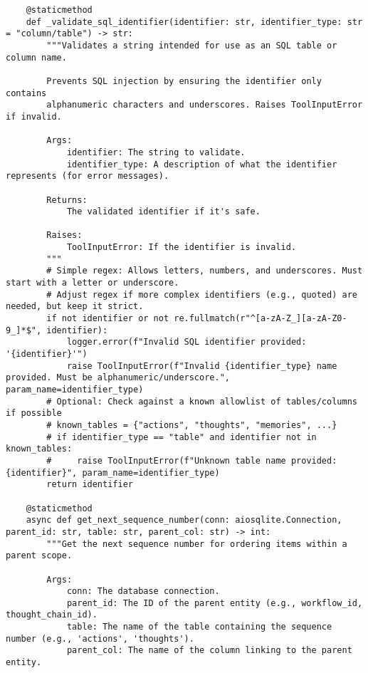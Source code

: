 \documentclass[12pt,a4paper]{article}
\begin{document}
\begin{pageablecode}
\begin{verbatim}
    @staticmethod
    def _validate_sql_identifier(identifier: str, identifier_type: str = "column/table") -> str:
        """Validates a string intended for use as an SQL table or column name.

        Prevents SQL injection by ensuring the identifier only contains
        alphanumeric characters and underscores. Raises ToolInputError if invalid.

        Args:
            identifier: The string to validate.
            identifier_type: A description of what the identifier represents (for error messages).

        Returns:
            The validated identifier if it's safe.

        Raises:
            ToolInputError: If the identifier is invalid.
        """
        # Simple regex: Allows letters, numbers, and underscores. Must start with a letter or underscore.
        # Adjust regex if more complex identifiers (e.g., quoted) are needed, but keep it strict.
        if not identifier or not re.fullmatch(r"^[a-zA-Z_][a-zA-Z0-9_]*$", identifier):
            logger.error(f"Invalid SQL identifier provided: '{identifier}'")
            raise ToolInputError(f"Invalid {identifier_type} name provided. Must be alphanumeric/underscore.", param_name=identifier_type)
        # Optional: Check against a known allowlist of tables/columns if possible
        # known_tables = {"actions", "thoughts", "memories", ...}
        # if identifier_type == "table" and identifier not in known_tables:
        #     raise ToolInputError(f"Unknown table name provided: {identifier}", param_name=identifier_type)
        return identifier
    
    @staticmethod
    async def get_next_sequence_number(conn: aiosqlite.Connection, parent_id: str, table: str, parent_col: str) -> int:
        """Get the next sequence number for ordering items within a parent scope.

        Args:
            conn: The database connection.
            parent_id: The ID of the parent entity (e.g., workflow_id, thought_chain_id).
            table: The name of the table containing the sequence number (e.g., 'actions', 'thoughts').
            parent_col: The name of the column linking to the parent entity.


\end{verbatim}
\end{pageablecode}
\end{document}
